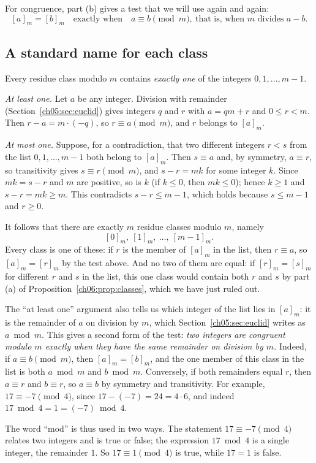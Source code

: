 For congruence, part (b) gives a test that we will use again and again:
\[
[a]_m=[b]_m\quad\text{exactly when}\quad a\equiv b\pmod m,\ \text{that is, when $m$ divides $a-b$.}
\]

\subsection*{A standard name for each class}
Every residue class modulo $m$ contains \emph{exactly one} of the integers $0,1,\ldots,m-1$.

\emph{At least one.} Let $a$ be any integer. Division with remainder (Section~\ref{ch05:sec:euclid}) gives integers $q$ and $r$ with $a=qm+r$ and $0\le r<m$. Then $r-a=m\cdot(-q)$, so $r\equiv a\pmod m$, and $r$ belongs to $[a]_m$.

\emph{At most one.} Suppose, for a contradiction, that two different integers $r<s$ from the list $0,1,\ldots,m-1$ both belong to $[a]_m$. Then $s\equiv a$ and, by symmetry, $a\equiv r$, so transitivity gives $s\equiv r\pmod m$, and $s-r=mk$ for some integer $k$. Since $mk=s-r$ and $m$ are positive, so is $k$ (if $k\le0$, then $mk\le0$); hence $k\ge1$ and $s-r=mk\ge m$. This contradicts $s-r\le m-1$, which holds because $s\le m-1$ and $r\ge0$.

It follows that there are exactly $m$ residue classes modulo $m$, namely
\[
[0]_m,\ [1]_m,\ \ldots,\ [m-1]_m.
\]
Every class is one of these: if $r$ is the member of $[a]_m$ in the list, then $r\equiv a$, so $[a]_m=[r]_m$ by the test above. And no two of them are equal: if $[r]_m=[s]_m$ for different $r$ and $s$ in the list, this one class would contain both $r$ and $s$ by part (a) of Proposition~\ref{ch06:prop:classes}, which we have just ruled out.

The ``at least one'' argument also tells us which integer of the list lies in $[a]_m$: it is the remainder of $a$ on division by $m$, which Section~\ref{ch05:sec:euclid} writes as $a\bmod m$. This gives a second form of the test: \emph{two integers are congruent modulo $m$ exactly when they have the same remainder on division by $m$.} Indeed, if $a\equiv b\pmod m$, then $[a]_m=[b]_m$, and the one member of this class in the list is both $a\bmod m$ and $b\bmod m$. Conversely, if both remainders equal $r$, then $a\equiv r$ and $b\equiv r$, so $a\equiv b$ by symmetry and transitivity. For example, $17\equiv-7\pmod4$, since $17-(-7)=24=4\cdot6$, and indeed $17\bmod4=1=(-7)\bmod4$.

The word ``mod'' is thus used in two ways. The statement $17\equiv-7\pmod4$ relates two integers and is true or false; the expression $17\bmod4$ is a single integer, the remainder $1$. So $17\equiv1\pmod4$ is true, while $17=1$ is false.

